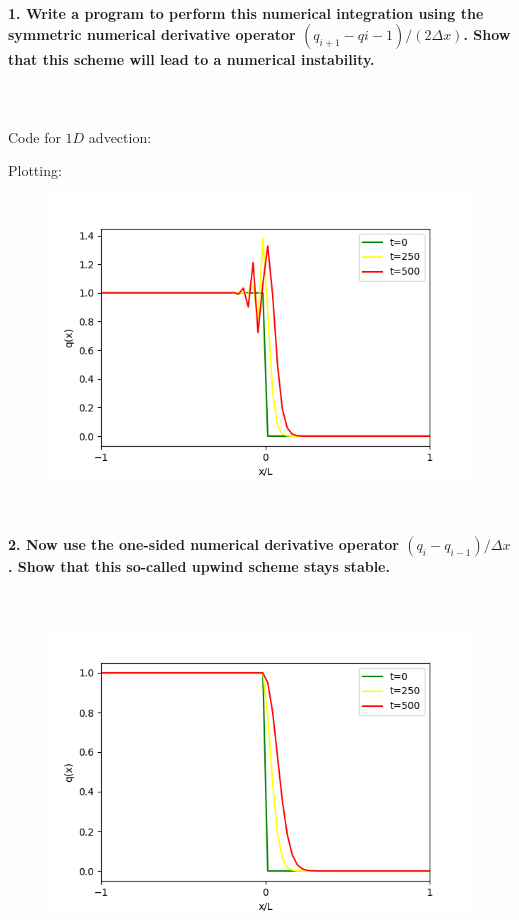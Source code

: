 \paragraph{1. Write a program to perform this numerical 
    integration using the symmetric numerical derivative 
    operator $(q_{i+1}-q{i-1})/(2\Delta x)$. Show that this 
    scheme will lead to a numerical instability.
} \ \\
    \\
    Code for $1D$ advection:
    
    \newpage\noindent
    Plotting:
    
    \begin{figure}[h!]
        \centering
        \includegraphics[width=.6\textwidth]{../figures/symmetric_1.png}
        \caption{}
    \end{figure} \ \\ 

\newpage
\paragraph{2. Now use the one-sided numerical derivative 
    operator $(q_i-q_{i-1})/\Delta x$. Show that this 
    so-called upwind scheme stays stable.
} \ \\
    \begin{figure}[h!]
        \centering
        \includegraphics[width=.6\textwidth]{../figures/upwind_2.png}
        \caption{}
    \end{figure} \ \\ 

